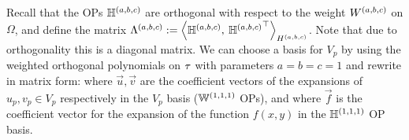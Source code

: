 Recall that the OPs $\mathbb{H}^{(a,b,c)}$ are orthogonal with respect to the weight ${W^{(a,b,c)}}$ on $\Omega$, and define the matrix $\Lambda^{(a,b,c)} :=  \ip< \bighdop^{(a,b,c)}, \: {\bighdop^{(a,b,c)}}^\top >_{\hdopabc}$. Note that due to orthogonality this is a diagonal matrix. We can choose a basis for $V_p$ by using the weighted orthogonal polynomials on $\tau$ with parameters $a = b = c = 1$
and rewrite  in matrix form:
where $\vec{u}, \vec{v}$ are the coefficient vectors of the expansions of $u_p, v_p \in V_p$ respectively in the $V_p$ basis (${\mathbb{W}^{(1,1,1)}}$ OPs), and
where $\vec{f}$ is the coefficient vector for the expansion of the function $f(x,y)$ in the ${\mathbb{H}^{(1,1,1)}}$ OP basis.

